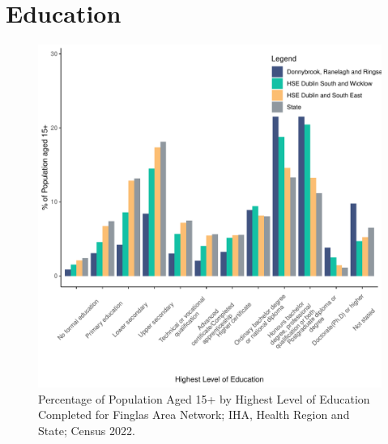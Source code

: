 \documentclass{article}
\begin{document}
\section{Education}\label{sect:Edu}
\begin{figure}[H]
	\centering
	\includegraphics[width = 120mm]{../figures/EduED.pdf}
	\caption{Percentage of Population Aged 15+ by Highest Level of Education Completed for Finglas Area Network; IHA, Health Region and State; Census 2022.}
	\label{fig:vbnv}
	\end{figure}
\end{document}
